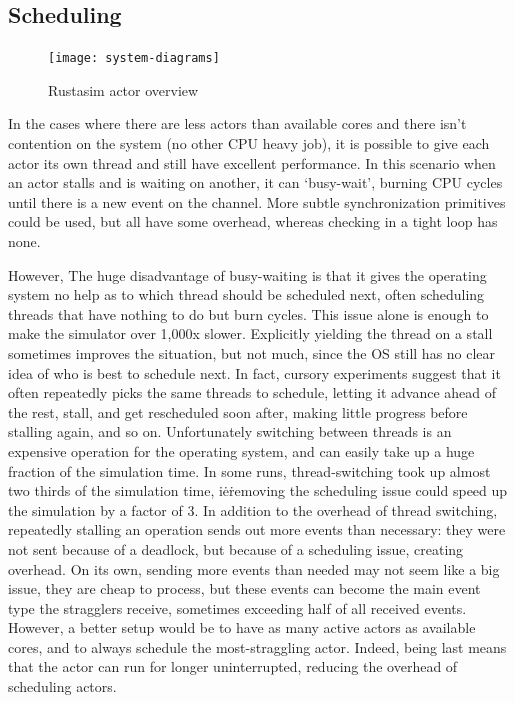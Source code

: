 \subsection{Scheduling} \label{rustasim-sched}

\begin{figure}[h]
    \texttt{[image: system-diagrams]}
    \caption{Rustasim actor overview}
    \label{rustasim-scheduling:fig}
\end{figure}

In the cases where there are less actors than available cores and there isn't contention on the system (no other CPU heavy job), it is possible to give each actor its own thread and still have excellent performance.
In this scenario when an actor stalls and is waiting on another, it can `busy-wait', burning CPU cycles until there is a new event on the channel.
More subtle synchronization primitives could be used, but all have some overhead, whereas checking in a tight loop has none.

However, The huge disadvantage of busy-waiting is that it gives the operating system no help as to which thread should be scheduled next, often scheduling threads that have nothing to do but burn cycles.
This issue alone is enough to make the simulator over 1,000x slower.
Explicitly yielding the thread on a stall sometimes improves the situation, but not much, since the OS still has no clear idea of who is best to schedule next.
In fact, cursory experiments suggest that it often repeatedly picks the same threads to schedule, letting it advance ahead of the rest, stall, and get rescheduled soon after, making little progress before stalling again, and so on.
Unfortunately switching between threads is an expensive operation for the operating system, and can easily take up a huge fraction of the simulation time.
In some runs, thread-switching took up almost two thirds of the simulation time, i\.e\. removing the scheduling issue could speed up the simulation by a factor of 3.
In addition to the overhead of thread switching, repeatedly stalling an operation sends out more  events than necessary: they were not sent because of a deadlock, but because of a scheduling issue, creating overhead.
On its own, sending more events than needed may not seem like a big issue, they are cheap to process, but these  events can become the main event type the stragglers receive, sometimes exceeding half of all received events.
\\


However, a better setup would be to have as many active actors as available cores, and to always schedule the most-straggling actor.
Indeed, being last means that the actor can run for longer uninterrupted, reducing the overhead of scheduling actors.

